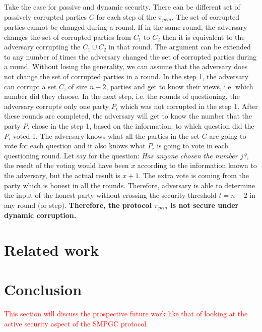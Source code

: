 \documentclass{llncs}
\begin{document}
Take the case for passive and dynamic security. There can be different set of passively corrupted parties $C$ for each step of the $\pi_{prm}$. The set of corrupted parties cannot be changed during a round. If in the same round, the adversary changes the set of corrupted parties from $C_1$ to $C_2$ then it is equivalent to the adversary corrupting the $C_1 \cup C_2$ in that round. The argument can be extended to any number of times the adversary changed the set of corrupted parties during a round. Without losing the generality, we can assume that the adversary does not change the set of corrupted parties in a round. In the step 1, the adversary can corrupt a set $C$, of size $n-2$, parties and get to know their views, i.e. which number did they choose. In the next step, i.e. the rounds of questioning, the adversary corrupts only one party $P_i$ which was not corrupted in the step 1. After these rounds are completed, the adversary will get to know the number that the party $P_i$ chose in the step 1, based on the information: to which question did the $P_i$ voted 1. The adversary knows what all the parties in the set $C$ are going to vote for each question and it also knows what $P_i$ is going to vote in each questioning round. Let say for the question: \textit{Has anyone chosen the number $j$?}, the result of the voting would have been $x$ according to the information known to the adversary, but the actual result is $x+1$. The extra vote is coming from the party which is honest in all the rounds. Therefore, adversary is able to determine the input of the honest party without crossing the security threshold $t=n-2$ in any round (or step). \textbf{Therefore, the protocol $\pi_{prm} $ is not secure under dynamic corruption.}
\section{Related work}

\section{Conclusion}

\textcolor{red}{This section will discuss the prospective future work like that of looking at the active security aspect of the SMPGC protocol.
}

\end{document}
